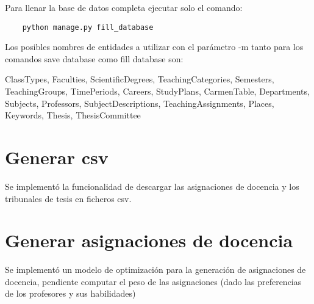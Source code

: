 Para llenar la base de datos completa ejecutar 
solo el comando:

\begin{verbatim}
    python manage.py fill_database
\end{verbatim}

Los posibles nombres de entidades a utilizar con
el parámetro -m tanto para los comandos 
save database como fill database son:

ClassTypes, Faculties,
ScientificDegrees, TeachingCategories,
Semesters, TeachingGroups, TimePeriods,
Careers, StudyPlans, CarmenTable, Departments,
Subjects, Professors, SubjectDescriptions, TeachingAssignments,
Places, Keywords, Thesis, ThesisCommittee

\section{Generar csv}

Se implementó la funcionalidad de descargar las 
asignaciones de docencia y los tribunales de 
tesis en ficheros csv.

\section{Generar asignaciones de docencia}

Se implementó un modelo de optimización para la 
generación de asignaciones de docencia, pendiente
computar el peso de las asignaciones (dado las
preferencias de los profesores y sus habilidades)
